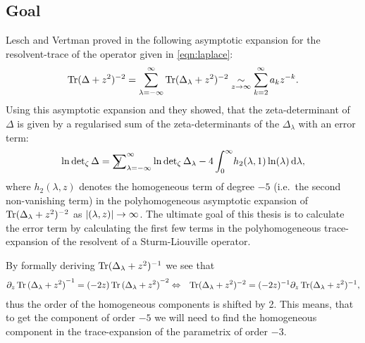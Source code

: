 \subsection{Goal}
Lesch and Vertman proved in \cite{LV13} the following asymptotic expansion for
the resolvent-trace of the operator given in \eqref{eqn:laplace}:
\begin{align}
  \Tr(\Delta + z^2)^{-2} = \sum_{\lambda=-\infty}^\infty \Tr(\Delta_\lambda +
  z^2)^{-2} \SimAs{z\to\infty} \sum_{k=2}^{\infty} a_kz^{-k}.
\end{align}
Using this asymptotic expansion and  they showed, that the
zeta-determinant of $\Delta$ is given by a regularised sum of the
zeta-determinants of the $\Delta_\lambda$ with an error term:
\begin{align}
  \Zetadet \Delta = \Regsum_{\lambda=-\infty}^\infty
  \ln\operatorname{det}_\zeta\Delta_\lambda -
  4\Integ[\infty]{0}{\lambda}{h_2(\lambda, 1)\ln(\lambda)},
\end{align}
where $h_2(\lambda, z)$ denotes the homogeneous term of degree $-5$ (i.e.\ the
second non-vanishing term) in the polyhomogeneous asymptotic expansion of
$\Tr(\Delta_\lambda + z^2)^{-2}$ as $\Abs{(\lambda, z)}\to\infty$. The ultimate
goal of this thesis is to calculate the error term by calculating the first few
terms in the polyhomogeneous trace-expansion of the resolvent of a
Sturm-Liouville operator.

By formally deriving $\Tr(\Delta_\lambda + z^2)^{-1}$ we see that
\begin{align*}
  \partial_z \Tr{(\Delta_\lambda + z^2)}^{-1} &=
        (-2z) \Tr{(\Delta_\lambda + z^2)}^{-2}
        \Leftrightarrow& \Tr(\Delta_\lambda + z^2)^{-2} =
        (-2z)^{-1}\partial_z\Tr(\Delta_\lambda + z^2)^{-1},
\end{align*}
thus the order of the homogeneous components is shifted by 2. This means, that
to get the component of order $-5$ we will need to find the homogeneous
component in the trace-expansion of the parametrix of order $-3$.

